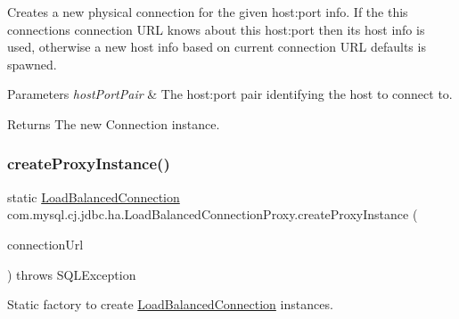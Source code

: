 Creates a new physical connection for the given host\+:port info. If the this connection\textquotesingle{}s connection U\+RL knows about this host\+:port then its host info is used, otherwise a new host info based on current connection U\+RL defaults is spawned.


\begin{DoxyParams}{Parameters}
{\em host\+Port\+Pair} & The host\+:port pair identifying the host to connect to. \\
\hline
\end{DoxyParams}
\begin{DoxyReturn}{Returns}
The new Connection instance. 
\end{DoxyReturn}
\mbox{\label{classcom_1_1mysql_1_1cj_1_1jdbc_1_1ha_1_1_load_balanced_connection_proxy_afc3968a242b38d47fdd116d3fdb8ac73}} 
\subsubsection{\texorpdfstring{create\+Proxy\+Instance()}{createProxyInstance()}}
{\footnotesize\ttfamily static \mbox{\hyperlink{interfacecom_1_1mysql_1_1cj_1_1jdbc_1_1ha_1_1_load_balanced_connection}{Load\+Balanced\+Connection}} com.\+mysql.\+cj.\+jdbc.\+ha.\+Load\+Balanced\+Connection\+Proxy.\+create\+Proxy\+Instance (\begin{DoxyParamCaption}\item[{\mbox{\hyperlink{classcom_1_1mysql_1_1cj_1_1conf_1_1url_1_1_loadbalance_connection_url}{Loadbalance\+Connection\+Url}}}]{connection\+Url }\end{DoxyParamCaption}) throws S\+Q\+L\+Exception\hspace{0.3cm}{\ttfamily [static]}}

Static factory to create \mbox{\hyperlink{interfacecom_1_1mysql_1_1cj_1_1jdbc_1_1ha_1_1_load_balanced_connection}{Load\+Balanced\+Connection}} instances.


